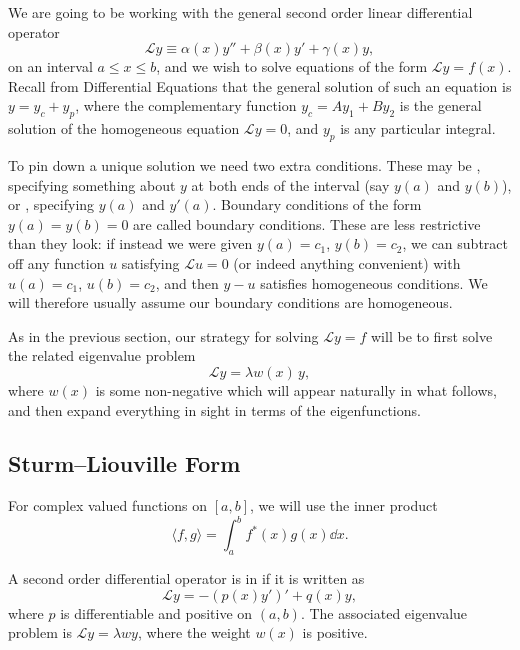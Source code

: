 We are going to be working with the general second order linear differential operator
$$
\mathcal{L} y \equiv \alpha(x) y'' + \beta(x) y' + \gamma(x) y,
$$
on an interval $a \leq x \leq b$, and we wish to solve equations of the form $\mathcal{L}y = f(x)$.
Recall from Differential Equations that the general solution of such an equation is $y = y_c + y_p$, where the complementary function $y_c = A y_1 + B y_2$ is the general solution of the homogeneous equation $\mathcal{L} y = 0$, and $y_p$ is any particular integral.

To pin down a unique solution we need two extra conditions. These may be , specifying something about $y$ at both ends of the interval (say $y(a)$ and $y(b)$), or , specifying $y(a)$ and $y'(a)$.
Boundary conditions of the form $y(a) = y(b) = 0$ are called  boundary conditions. These are less restrictive than they look: if instead we were given $y(a) = c_1$, $y(b) = c_2$, we can subtract off any function $u$ satisfying $\mathcal{L}u = 0$ (or indeed anything convenient) with $u(a) = c_1$, $u(b) = c_2$, and then $y - u$ satisfies homogeneous conditions. We will therefore usually assume our boundary conditions are homogeneous.

As in the previous section, our strategy for solving $\mathcal{L} y = f$ will be to first solve the related eigenvalue problem
$$
\mathcal{L} y = \lambda w(x)\, y,
$$
where $w(x)$ is some non-negative  which will appear naturally in what follows, and then expand everything in sight in terms of the eigenfunctions.

\subsection{Sturm--Liouville Form}

For complex valued functions on $[a, b]$, we will use the inner product
$$
\langle f, g \rangle = \int_a^b f^*(x) g(x) \dd x.
$$

\begin{definition}
    A second order differential operator is in  if it is written as
    $$
    \mathcal{L} y = -\left(p(x) y'\right)' + q(x) y,
    $$
    where $p$ is differentiable and positive on $(a, b)$.
    The associated eigenvalue problem is $\mathcal{L}y = \lambda w y$, where the weight $w(x)$ is positive.
\end{definition}

